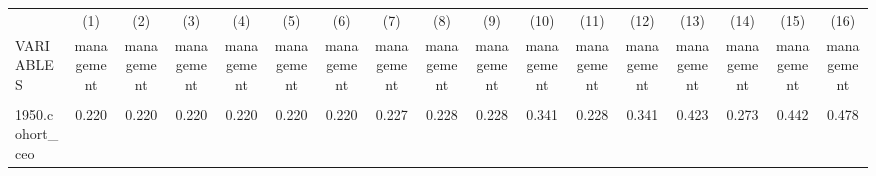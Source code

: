 \begin{center}
\begin{tabular}{lcccccccccccccccc} \hline
 & (1) & (2) & (3) & (4) & (5) & (6) & (7) & (8) & (9) & (10) & (11) & (12) & (13) & (14) & (15) & (16) \\
VARIABLES & management & management & management & management & management & management & management & management & management & management & management & management & management & management & management & management \\ \hline
\vspace{4pt} & \begin{footnotesize}\end{footnotesize} & \begin{footnotesize}\end{footnotesize} & \begin{footnotesize}\end{footnotesize} & \begin{footnotesize}\end{footnotesize} & \begin{footnotesize}\end{footnotesize} & \begin{footnotesize}\end{footnotesize} & \begin{footnotesize}\end{footnotesize} & \begin{footnotesize}\end{footnotesize} & \begin{footnotesize}\end{footnotesize} & \begin{footnotesize}\end{footnotesize} & \begin{footnotesize}\end{footnotesize} & \begin{footnotesize}\end{footnotesize} & \begin{footnotesize}\end{footnotesize} & \begin{footnotesize}\end{footnotesize} & \begin{footnotesize}\end{footnotesize} & \begin{footnotesize}\end{footnotesize} \\
1950.cohort\_ceo & 0.220 & 0.220 & 0.220 & 0.220 & 0.220 & 0.220 & 0.227 & 0.228 & 0.228 & 0.341 & 0.228 & 0.341 & 0.423 & 0.273 & 0.442 & 0.478 \\

\end{tabular}
\end{center}
